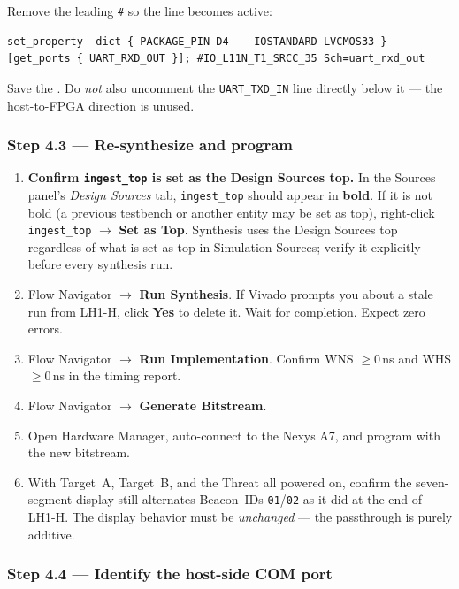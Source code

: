 \documentclass[11pt,letterpaper]{article}
\begin{document}
Remove the leading \texttt{\#} so the line becomes active:

\begin{lstlisting}[language={[Sharp]C}, basicstyle=\scriptsize\ttfamily]
set_property -dict { PACKAGE_PIN D4    IOSTANDARD LVCMOS33 } [get_ports { UART_RXD_OUT }]; #IO_L11N_T1_SRCC_35 Sch=uart_rxd_out
\end{lstlisting}

Save the \XDC{}. Do \emph{not} also uncomment the \texttt{UART\_TXD\_IN} line directly below it --- the host-to-FPGA direction is unused.

\subsubsection*{Step 4.3 --- Re-synthesize and program}

\begin{enumerate}[leftmargin=2em]
	\item \textbf{Confirm \texttt{ingest\_top} is set as the Design Sources top.} In the Sources panel's \textit{Design Sources} tab, \texttt{ingest\_top} should appear in \textbf{bold}. If it is not bold (a previous testbench or another entity may be set as top), right-click \texttt{ingest\_top} $\to$ \textbf{Set as Top}. Synthesis uses the Design Sources top regardless of what is set as top in Simulation Sources; verify it explicitly before every synthesis run.
	\item Flow Navigator $\to$ \textbf{Run Synthesis}. If Vivado prompts you about a stale run from LH1-H, click \textbf{Yes} to delete it. Wait for completion. Expect zero errors.
	\item Flow Navigator $\to$ \textbf{Run Implementation}. Confirm WNS $\geq 0$\,ns and WHS $\geq 0$\,ns in the timing report.
	\item Flow Navigator $\to$ \textbf{Generate Bitstream}.
	\item Open Hardware Manager, auto-connect to the Nexys A7, and program with the new bitstream.
	\item With Target~A, Target~B, and the Threat all powered on, confirm the seven-segment display still alternates Beacon~IDs \texttt{01}/\texttt{02} as it did at the end of LH1-H. The display behavior must be \emph{unchanged} --- the passthrough is purely additive.
\end{enumerate}

\subsubsection*{Step 4.4 --- Identify the host-side \mbox{COM} port}
\end{document}

